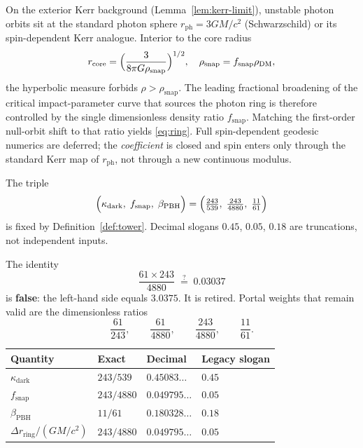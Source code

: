 \begin{lemma}
\label{lem:geodesic}
On the exterior Kerr background (Lemma~\ref{lem:kerr-limit}), unstable photon
orbits sit at the standard photon sphere \(r_{\mathrm{ph}}=3GM/c^2\) (Schwarzschild)
or its spin-dependent Kerr analogue. Interior to the core radius
\[
r_{\mathrm{core}}
=\Bigl(\frac{3}{8\pi G\rho_{\mathrm{snap}}}\Bigr)^{1/2},
\quad
\rho_{\mathrm{snap}}=f_{\mathrm{snap}}\rho_{\mathrm{DM}},
\]
the hyperbolic measure forbids \(\rho>\rho_{\mathrm{snap}}\). The leading fractional
broadening of the critical impact-parameter curve that sources the photon ring
is therefore controlled by the single dimensionless density ratio
\(f_{\mathrm{snap}}\). Matching the first-order null-orbit shift to that ratio yields
\eqref{eq:ring}. Full spin-dependent geodesic numerics are deferred; the
\emph{coefficient} is closed and spin enters only through the standard Kerr map
of \(r_{\mathrm{ph}}\), not through a new continuous modulus.
\end{lemma}

\begin{theorem}
\label{thm:no-free}
The triple
\[
\Bigl(
\kappa_{\mathrm{dark}},\;
f_{\mathrm{snap}},\;
\beta_{\mathrm{PBH}}
\Bigr)
=
\Bigl(
\tfrac{243}{539},\;
\tfrac{243}{4880},\;
\tfrac{11}{61}
\Bigr)
\]
is fixed by Definition~\ref{def:tower}. Decimal slogans \(0.45\), \(0.05\),
\(0.18\) are truncations, not independent inputs.
\end{theorem}

\begin{remark}
The identity
\[
\frac{61\times 243}{4880}\;\stackrel{?}{=}\;0.03037
\]
is \textbf{false}: the left-hand side equals \(3.0375\). It is retired.
Portal weights that remain valid are the dimensionless ratios
\[
\frac{61}{243},\qquad
\frac{61}{4880},\qquad
\frac{243}{4880},\qquad
\frac{11}{61}.
\]
\end{remark}

\begin{center}
\begin{tabular}{@{}llll@{}}
\toprule
Quantity & Exact & Decimal & Legacy slogan \\
\midrule
\(\kappa_{\mathrm{dark}}\) & \(243/539\) & \(0.45083\ldots\) & \(0.45\) \\
\(f_{\mathrm{snap}}\) & \(243/4880\) & \(0.049795\ldots\) & \(0.05\) \\
\(\beta_{\mathrm{PBH}}\) & \(11/61\) & \(0.180328\ldots\) & \(0.18\) \\
\(\Delta r_{\mathrm{ring}}/(GM/c^2)\) & \(243/4880\) & \(0.049795\ldots\) & \(0.05\) \\
\bottomrule
\end{tabular}
\end{center}

